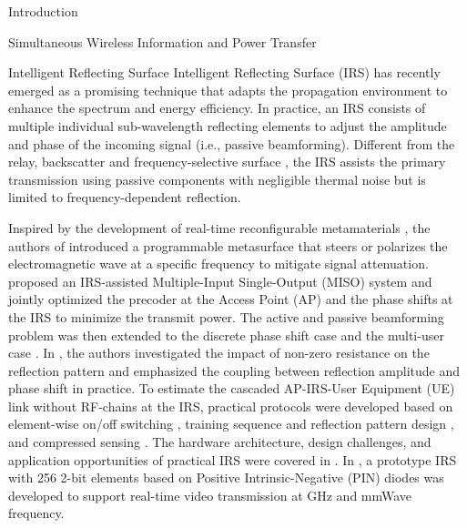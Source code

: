 \documentclass[journal,12pt,onecolumn,draftclsnofoot]{IEEEtran}
\begin{document}
\begin{section}{Introduction}
\begin{subsection}{Simultaneous Wireless Information and Power Transfer}
		\end{subsection}


		\begin{subsection}{Intelligent Reflecting Surface}
			Intelligent Reflecting Surface (IRS) has recently emerged as a promising technique that adapts the propagation environment to enhance the spectrum and energy efficiency. In practice, an IRS consists of multiple individual sub-wavelength reflecting elements to adjust the amplitude and phase of the incoming signal (i.e., passive beamforming). Different from the relay, backscatter and frequency-selective surface \cite{Anwar2018}, the IRS assists the primary transmission using passive components with negligible thermal noise but is limited to frequency-dependent reflection.

			Inspired by the development of real-time reconfigurable metamaterials \cite{Cui2014}, the authors of \cite{Liaskos2018} introduced a programmable metasurface that steers or polarizes the electromagnetic wave at a specific frequency to mitigate signal attenuation. \cite{Wu2018} proposed an IRS-assisted Multiple-Input Single-Output (MISO) system and jointly optimized the precoder at the Access Point (AP) and the phase shifts at the IRS to minimize the transmit power. The active and passive beamforming problem was then extended to the discrete phase shift case \cite{Wu2019a} and the multi-user case \cite{Wu2019}. In \cite{Abeywickrama2020}, the authors investigated the impact of non-zero resistance on the reflection pattern and emphasized the coupling between reflection amplitude and phase shift in practice. To estimate the cascaded AP-IRS-User Equipment (UE) link without RF-chains at the IRS, practical protocols were developed based on element-wise on/off switching \cite{Nadeem2019}, training sequence and reflection pattern design \cite{You2019,Kang2020}, and compressed sensing \cite{Wang2020}. The hardware architecture, design challenges, and application opportunities of practical IRS were covered in \cite{Wu2020}. In \cite{Dai2020}, a prototype IRS with \num{256} \num{2}-bit elements based on Positive Intrinsic-Negative (PIN) diodes was developed to support real-time video transmission at \si{GHz} and mmWave frequency.
		\end{subsection}



\end{section}
\end{document}
